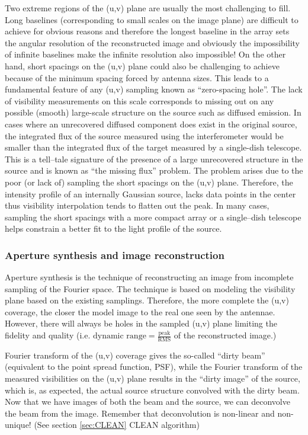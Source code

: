 \documentclass[paper=a4, fontsize=11pt]{scrartcl} %
\numberwithin{equation}{section} %
\numberwithin{figure}{section} %
\numberwithin{table}{section} %
\begin{document}
Two extreme regions of the (u,v) plane are usually the most challenging to fill. Long baselines (corresponding to small scales on the image plane) are difficult to achieve for obvious reasons and therefore the longest baseline in the array sets the angular resolution of the reconstructed image and obviously the impossibility of infinite baselines make the infinite resolution also impossible! On the other hand, short spacings on the (u,v) plane could also be challenging to achieve because of the minimum spacing forced by antenna sizes. This leads to a fundamental feature of any (u,v) sampling known as ``zero-spacing hole''. The lack of visibility measurements on this scale corresponds to missing out on any possible (smooth) large-scale structure on the source such as diffused emission. In cases where an unrecovered diffused component does exist in the original source, the integrated flux of the source measured using the interferometer would be smaller than the integrated flux of the target measured by a single-dish telescope. This is a tell--tale signature of the presence of a large unrecovered structure in the source and is known as ``the missing flux'' problem. The problem arises due to the poor (or lack of) sampling the short spacings on the (u,v) plane. Therefore, the intensity profile of an internally Gaussian source, lacks data points in the center thus visibility interpolation tends to flatten out the peak. In many cases, sampling the short spacings with a more compact array or a single--dish telescope helps constrain a better fit to the light profile of the source.

\subsubsection*{Aperture synthesis and image reconstruction}
Aperture synthesis is the technique of reconstructing an image from incomplete sampling of the Fourier space. The technique is based on modeling the visibility plane based on the existing samplings. Therefore, the more complete the (u,v) coverage, the closer the model image to the real one seen by the antennae. However, there will always be holes in the sampled (u,v) plane limiting the fidelity and quality (i.e. $\text{dynamic range} = \frac{\text{peak}}{\text{RMS}}$ of the reconstructed image.)



Fourier transform of the (u,v) coverage gives the so-called ``dirty beam'' (equivalent to the point spread function, PSF), while the Fourier transform of the measured visibilities on the (u,v) plane results in the ``dirty image'' of the source, which is, as expected, the actual source structure convolved with the dirty beam. Now that we have images of both the beam and the source, we can deconvolve the beam from the image. Remember that deconvolution is non-linear and non-unique! (See section \ref{sec:CLEAN} CLEAN algorithm)
\end{document}
